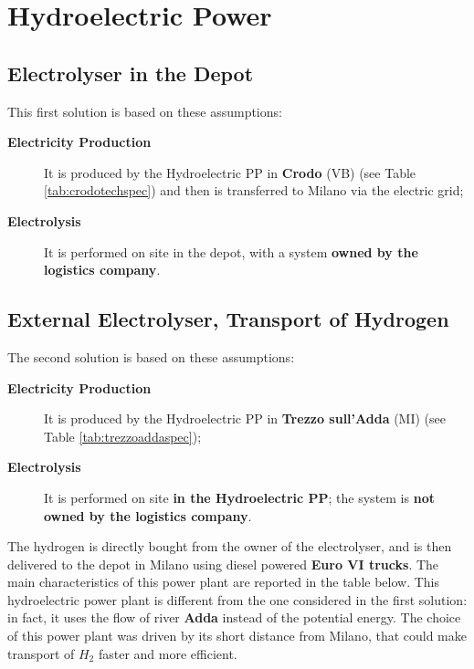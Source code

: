 

\newpage
\section{Hydroelectric Power}
\subsection{Electrolyser in the Depot}

This first solution is based on these assumptions:

\begin{description}
    \item[\textbf{Electricity Production}] It is produced by the Hydroelectric PP in \textbf{Crodo} (VB) (see Table \ref{tab:crodotechspec}) and then is transferred to Milano via the electric grid;
    \item[\textbf{Electrolysis}] It is performed on site in the depot, with a system\textbf{ owned by the logistics company}.
\end{description}



\subsection{External Electrolyser, Transport of Hydrogen}
The second solution is based on these assumptions:

\begin{description}
    \item[\textbf{Electricity Production}] It is produced by the Hydroelectric PP in \textbf{Trezzo sull'Adda} (MI) (see Table \ref{tab:trezzoaddaspec});
    \item[\textbf{Electrolysis}] It is performed on site \textbf{in the Hydroelectric PP}; the system is \textbf{not owned by the logistics company}.
\end{description}



\newpage
The hydrogen is directly bought from the owner of the electrolyser, and is then delivered to the depot in Milano using diesel powered \textbf{Euro VI trucks}. The main characteristics of this power plant are reported in the table below. This hydroelectric power plant is different from the one considered in the first solution: in fact, it uses the flow of river \textbf{Adda} instead of the potential energy. The choice of this power plant was driven by its short distance from Milano, that could make transport of $H_2$ faster and more efficient.

